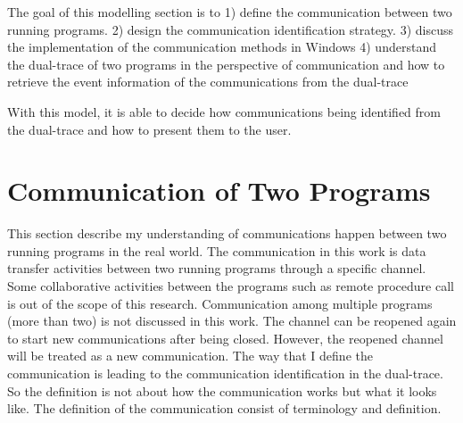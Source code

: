 \label{chapter:Mod}
The goal of this modelling section is to 1) define the communication between two running programs. 2) design the communication identification strategy. 3) discuss the implementation of the communication methods in Windows 4) understand the dual-trace of two programs in the perspective of communication and how to retrieve the event information of the communications from the dual-trace  

With this model, it is able to decide how communications being identified from the dual-trace and how to present them to the user.

\section{Communication of Two Programs}   
This section describe my understanding of communications happen between two running programs in the real world. The communication in this work is data transfer activities between two running programs through a specific channel. Some collaborative activities between the programs such as remote procedure call is out of the scope of this research. Communication among multiple programs (more than two) is not discussed in this work. The channel can be reopened again to start new communications after being closed. However, the reopened channel will be treated as a new communication. The way that I define the communication is leading to the communication identification in the dual-trace. So the definition is not about how the communication works but what it looks like. The definition of the communication consist of terminology and definition.

